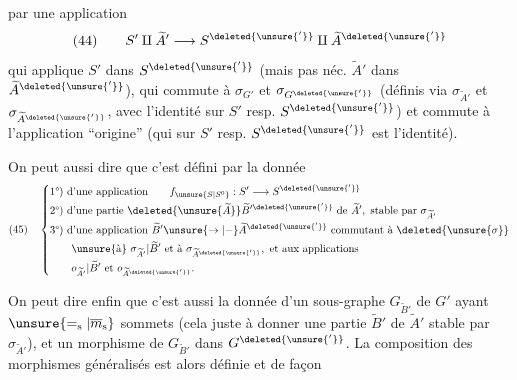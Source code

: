 par une application
\[
(44)\qquad S'\amalg\widetilde A'\longrightarrow S^{\deleted{\unsure{'}}}\amalg\widetilde A^{\deleted{\unsure{'}}}
\]
qui applique $S'$ dans $S^{\deleted{\unsure{'}}}$ (mais pas néc. $\widetilde A'$ dans $\widetilde A^{\deleted{\unsure{'}}}$), qui commute à $\sigma_{G'}$ et $\sigma_{G^{\deleted{\unsure{'}}}}$ (définis via $\sigma_{\widetilde A'}$ et $\sigma_{\widetilde A^{\deleted{\unsure{'}}}}$, avec l'identité sur $S'$ resp. $S^{\deleted{\unsure{'}}}$) et commute à l'application ``origine'' (qui sur $S'$ resp. $S^{\deleted{\unsure{'}}}$ est l'identité).

On peut aussi dire que c'est défini par la donnée
\[
(45)\quad\left\{\begin{aligned}
&\text{1°) d'une application}\qquad f_{\unsure{S|S^0}}:S'\longrightarrow S^{\deleted{\unsure{'}}}\\
&\text{2°) d'une partie }\deleted{\unsure{\widetilde A}}\widetilde B'^{\deleted{\unsure{'}}}\text{ de }\widetilde A',\text{ stable par }\sigma_{\widetilde A'}\\
&\text{3°) d'une application }\widetilde B'\unsure{\to|{-}}\widetilde A^{\deleted{\unsure{'}}}\text{ commutant à }\deleted{\unsure{\sigma}}\\
&\qquad\unsure{\text{à}}\ \sigma_{\widetilde A'}|\widetilde B'\text{ et à }\sigma_{\widetilde A^{\deleted{\unsure{'}}}},\text{ et aux applications}\\
&\qquad o_{\widetilde A'}|\widetilde B'\text{ et }o_{\widetilde A^{\deleted{\unsure{'}}}}.
\end{aligned}\right.
\]

On peut dire enfin que c'est aussi la donnée d'un sous-graphe $G_{\widetilde B'}$ de $G'$ ayant $\unsure{=_{\mathrm s}|\overline m_{\mathrm s}}$ sommets (cela  juste  à donner une partie $\widetilde B'$ de $\widetilde A'$ stable par $\sigma_{\widetilde A'}$), et un morphisme de $G_{\widetilde B'}$ dans $G^{\deleted{\unsure{'}}}$. La composition des morphismes généralisés est alors définie et  de façon
